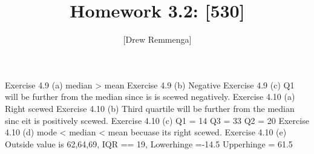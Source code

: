 \documentclass[10pt, oneside]{article}
\title{Homework 3.2: [530]}
\author{[Drew Remmenga]}
\begin{document}
\maketitle
\pagebreak
Exercise 4.9 (a)
median > mean
\clearpage
Exercise 4.9 (b)
Negative
\clearpage
Exercise 4.9 (c)
Q1 will be further from the median since is is scewed negatively. 
\clearpage
Exercise 4.10 (a)
Right scewed
\clearpage
Exercise 4.10 (b)
Third quartile will be further from the median sinc eit is positively scewed.
\clearpage
Exercise 4.10 (c)
Q1 = 14
Q3 = 33
Q2 = 20
\clearpage
Exercise 4.10 (d)
mode < median < mean becuase its right scewed. 
\clearpage
Exercise 4.10 (e)
Outside value is 62,64,69, IQR == 19, Lowerhinge =-14.5 Upperhinge = 61.5
\end{document}
